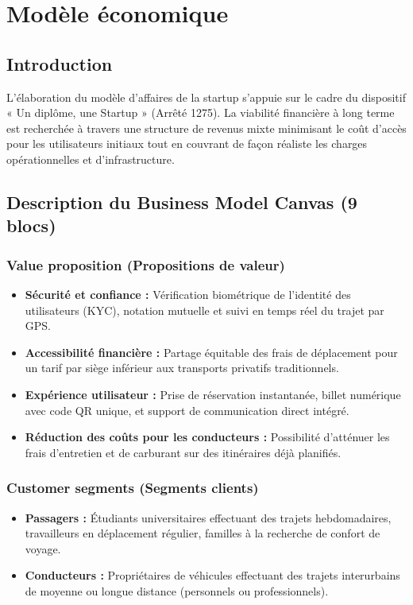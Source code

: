 \documentclass[11pt,a4paper]{article}
\begin{document}
\section{Modèle économique}

\subsection{Introduction}
L'élaboration du modèle d'affaires de la startup s'appuie sur le cadre du dispositif « Un diplôme, une Startup » (Arrêté 1275). La viabilité financière à long terme est recherchée à travers une structure de revenus mixte minimisant le coût d'accès pour les utilisateurs initiaux tout en couvrant de façon réaliste les charges opérationnelles et d'infrastructure.

\subsection{Description du Business Model Canvas (9 blocs)}

\subsubsection{Value proposition (Propositions de valeur)}
\begin{itemize}[leftmargin=1.5em]
  \item \textbf{Sécurité et confiance :} Vérification biométrique de l'identité des utilisateurs (KYC), notation mutuelle et suivi en temps réel du trajet par GPS.
  \item \textbf{Accessibilité financière :} Partage équitable des frais de déplacement pour un tarif par siège inférieur aux transports privatifs traditionnels.
  \item \textbf{Expérience utilisateur :} Prise de réservation instantanée, billet numérique avec code QR unique, et support de communication direct intégré.
  \item \textbf{Réduction des coûts pour les conducteurs :} Possibilité d'atténuer les frais d'entretien et de carburant sur des itinéraires déjà planifiés.
\end{itemize}

\subsubsection{Customer segments (Segments clients)}
\begin{itemize}[leftmargin=1.5em]
  \item \textbf{Passagers :} Étudiants universitaires effectuant des trajets hebdomadaires, travailleurs en déplacement régulier, familles à la recherche de confort de voyage.
  \item \textbf{Conducteurs :} Propriétaires de véhicules effectuant des trajets interurbains de moyenne ou longue distance (personnels ou professionnels).
\end{itemize}
\end{document}
